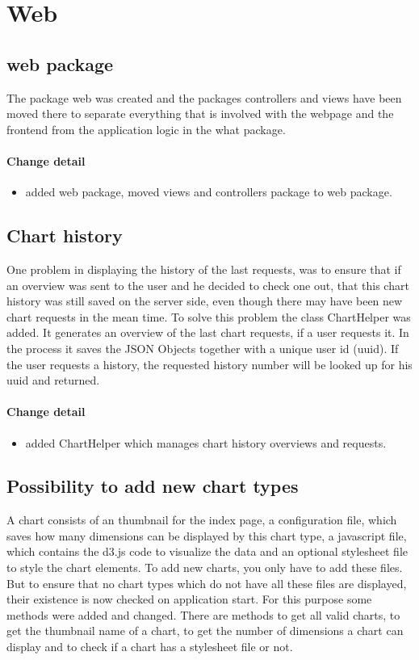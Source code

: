 \section{Web}
\subsection{web package}
The package web was created and the packages controllers and views have been moved there to separate everything that is involved with the webpage and the frontend from the application logic in the what package.

\paragraph{Change detail}
\begin{itemize}
  \item added web package, moved views and controllers package to web package.
\end{itemize}

\subsection{Chart history}
One problem in displaying the history of the last requests, was to ensure that if an overview was sent to the user and he decided to check one out, that this chart history was still saved on the server side, even though there may have been new chart requests in the mean time.
To solve this problem the class ChartHelper was added. It generates an overview of the last chart requests, 
if a user requests it. In the process it saves the JSON Objects together with a unique user id (uuid). 
If the user requests a history, the requested history number will be looked up for his uuid and returned.

\paragraph{Change detail}
\begin{itemize}
  \item added ChartHelper which manages chart history overviews and requests.
\end{itemize}

\subsection{Possibility to add new chart types}
A chart consists of an thumbnail for the index page, a configuration file, which saves how many dimensions can be displayed by this chart type,
a javascript file, which contains the d3.js code to visualize the data and an optional stylesheet file to style the chart elements.
To add new charts, you only have to add these files.
But to ensure that no chart types which do not have all these files are displayed, their existence is now checked on application start.
For this purpose some methods were added and changed. There are methods to get all valid charts, to get the thumbnail name of a chart,
to get the number of dimensions a chart can display and to check if a chart has a stylesheet file or not.

